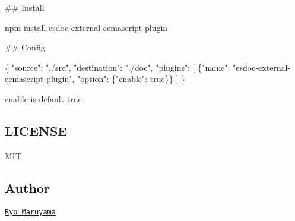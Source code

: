 \#\# Install 
\begin{DoxyCode}
npm install esdoc-external-ecmascript-plugin
\end{DoxyCode}


\#\# Config 
\begin{DoxyCode}
\{
  "source": "./src",
  "destination": "./doc",
  "plugins": [
    \{"name": "esdoc-external-ecmascript-plugin", "option": \{"enable": true\}\}
  ]
\}
\end{DoxyCode}


{\ttfamily enable} is default {\ttfamily true}.

\subsection*{L\+I\+C\+E\+N\+SE}

M\+IT

\subsection*{Author}

\href{https://github.com/h13i32maru}{\tt Ryo Maruyama} 